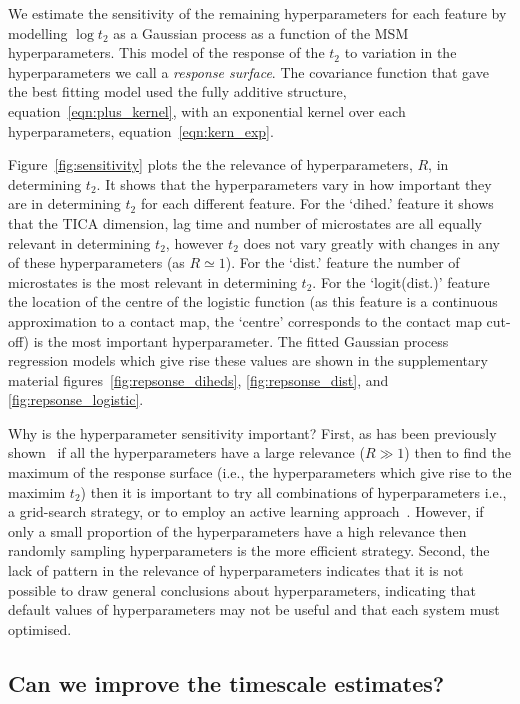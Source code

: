 \documentclass[journal=jacsat,manuscript=article]{achemso}
\begin{document}
We estimate the sensitivity of the remaining hyperparameters for each feature by modelling $\log{t_{2}}$ as a Gaussian process as a function of the MSM hyperparameters. This model of the response of the $t_2$ to variation in the hyperparameters we call a \emph{response surface}. The covariance function that gave the best fitting model used the fully additive structure, equation~\ref{eqn:plus_kernel}, with an exponential kernel over each hyperparameters, equation~\ref{eqn:kern_exp}. 

Figure~\ref{fig:sensitivity} plots the  the relevance of hyperparameters, $R$, in determining $t_{2}$. It shows that the hyperparameters vary in how important they are in determining $t_2$ for each different feature.  For the `dihed.' feature it shows that the TICA dimension, lag time and number of microstates are all equally relevant in determining $t_2$, however $t_2$ does not vary greatly with changes in any of these hyperparameters (as $R\simeq 1$). For the `dist.' feature the number of microstates is the most relevant in determining $t_2$. For the `logit(dist.)' feature the location of the centre of the logistic function (as this feature is a continuous approximation to a contact map, the `centre' corresponds  to the contact map cut-off) is the most important hyperparameter. The fitted Gaussian process regression models which give rise these values are shown in the supplementary material figures~\ref{fig:repsonse_diheds}, \ref{fig:repsonse_dist}, and \ref{fig:repsonse_logistic}. 

Why is the hyperparameter sensitivity important? First, as has been  previously shown~\cite{bergstra_jamesbergstra_random_2012} if all the hyperparameters have a large relevance ($R \gg 1$) then to find the maximum of the response surface (i.e., the hyperparameters which give rise to the maximim $t_2$) then it is important to try all combinations of hyperparameters i.e., a  grid-search strategy, or to employ an active learning approach~\cite{snoekAbstractBayesianOptimization2013}.  However, if only a small proportion of the hyperparameters have a high relevance then randomly sampling hyperparameters is the more efficient strategy.  Second, the lack of pattern in the relevance of hyperparameters indicates that it is not possible to draw general conclusions about hyperparameters, indicating that default values of hyperparameters may not be useful and that each system must optimised. 


\subsection{Can we improve the timescale estimates?}
\end{document}
